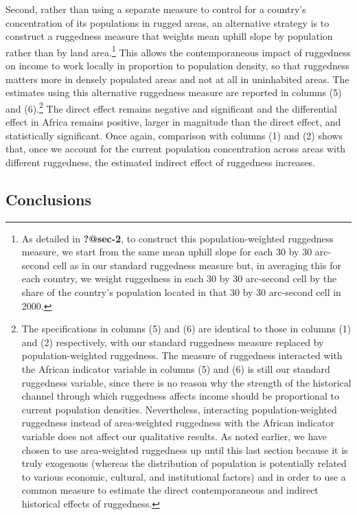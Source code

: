 \documentclass[
  letterpaper,
  DIV=11,
  numbers=noendperiod]{scrartcl}
\begin{document}
Second, rather than using a separate measure to control for a country's
concentration of its populations in rugged areas, an alternative
strategy is to construct a ruggedness measure that weights mean uphill
slope by population rather than by land area.\footnote{As detailed in
  \textbf{?@sec-2}, to construct this population-weighted ruggedness
  measure, we start from the same mean uphill slope for each 30 by 30
  arc-second cell as in our standard ruggedness measure but, in
  averaging this for each country, we weight ruggedness in each 30 by 30
  arc-second cell by the share of the country's population located in
  that 30 by 30 arc-second cell in 2000.} This allows the
contemporaneous impact of ruggedness on income to work locally in
proportion to population density, so that ruggedness matters more in
densely populated areas and not at all in uninhabited areas. The
estimates using this alternative ruggedness measure are reported in
columns (5) and (6).\footnote{The specifications in columns (5) and (6)
  are identical to those in columns (1) and (2) respectively, with our
  standard ruggedness measure replaced by population-weighted
  ruggedness. The measure of ruggedness interacted with the African
  indicator variable in columns (5) and (6) is still our standard
  ruggedness variable, since there is no reason why the strength of the
  historical channel through which ruggedness affects income should be
  proportional to current population densities. Nevertheless,
  interacting population-weighted ruggedness instead of area-weighted
  ruggedness with the African indicator variable does not affect our
  qualitative results. As noted earlier, we have chosen to use
  area-weighted ruggedness up until this last section because it is
  truly exogenous (whereas the distribution of population is potentially
  related to various economic, cultural, and institutional factors) and
  in order to use a common measure to estimate the direct
  contemporaneous and indirect historical effects of ruggedness.} The
direct effect remains negative and significant and the differential
effect in Africa remains positive, larger in magnitude than the direct
effect, and statistically significant. Once again, comparison with
columns (1) and (2) shows that, once we account for the current
population concentration across areas with different ruggedness, the
estimated indirect effect of ruggedness increases.

\subsection{Conclusions}\label{conclusions}
\end{document}
